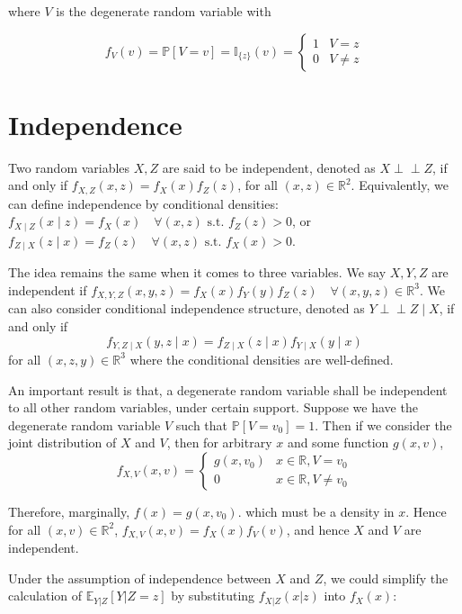 \documentclass[
]{book}
\begin{document}
where \(V\) is the degenerate random variable with

\[ f_V(v)= \mathbb{P}[V=v]=\mathbb{I}_{\{z\}}(v) = \begin{cases}1 & V=z \\ 0 & V \neq z\end{cases}\]

\hypertarget{independence}{%
\section{Independence}\label{independence}}

Two random variables \(X, Z\) are said to be independent, denoted as \(X \perp \!\!\! \perp Z\), if and only if \(f_{X, Z}(x, z)=f_X(x) f_Z(z)\), for all \((x, z) \in \mathbb{R}^2\). Equivalently, we can define independence by conditional densities: \(f_{X \mid Z}(x \mid z)=f_X(x) \quad \forall(x, z) \text { s.t. } f_Z(z)>0\), or \(f_{Z \mid X}(z \mid x)=f_Z(z) \quad \forall(x, z) \text { s.t. } f_X(x)>0\).

The idea remains the same when it comes to three variables. We say \(X,Y,Z\) are independent if \(f_{X, Y, Z}(x, y, z)=f_X(x) f_Y(y) f_Z(z) \quad \forall(x, y, z) \in \mathbb{R}^3\). We can also consider conditional independence structure, denoted as \(Y \perp \!\!\! \perp Z \mid X\), if and only if \[
f_{Y, Z \mid X}(y, z \mid x)=f_{Z \mid X}(z \mid x) f_{Y \mid X}(y \mid x)
\] for all \((x, z, y) \in \mathbb{R}^3\) where the conditional densities are well-defined.

An important result is that, a degenerate random variable shall be independent to all other random variables, under certain support. Suppose we have the degenerate random variable \(V\) such that \(\mathbb{P}[V=v_0]=1\). Then if we consider the joint distribution of \(X\) and \(V\), then for arbitrary \(x\) and some function \(g(x,v)\), \[ f_{X, V}(x, v)= \left\{\begin{array}{cc}
g\left(x, v_0\right) & x \in \mathbb{R}, V=v_0 \\
0 & x \in \mathbb{R}, V \neq v_0
\end{array}\right.\]

Therefore, marginally, \(f(x) = g(x,v_0)\). which must be a density in \(x\). Hence for all \((x, v) \in \mathbb{R}^2\), \(f_{X, V}(x, v)=f_X(x) f_V(v)\), and hence \(X\) and \(V\) are independent.

Under the assumption of independence between \(X\) and \(Z\), we could simplify the calculation of \(\mathbb{E}_{Y|Z}[Y|Z=z]\) by substituting \(f_{X|Z}(x|z)\) into \(f_{X}(x)\):
\end{document}
